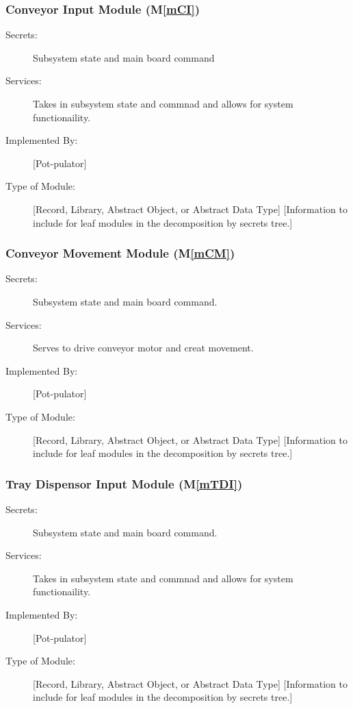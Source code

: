 \documentclass[12pt, titlepage]{article}
\newcommand{\mref}[1]{M\ref{#1}}
\begin{document}
\subsubsection{Conveyor Input Module (\mref{mCI})}
\begin{description}
\item[Secrets:] Subsystem state and main board command
\item[Services:] Takes in subsystem state and commnad and allows for system functionaility.
\item[Implemented By:] [Pot-pulator]
\item[Type of Module:] [Record, Library, Abstract Object, or Abstract Data Type]
  [Information to include for leaf modules in the decomposition by secrets tree.]
\end{description}


\subsubsection{Conveyor Movement Module (\mref{mCM})}
\begin{description}
\item[Secrets:] Subsystem state and main board command.
\item[Services:] Serves to drive conveyor motor and creat movement.
\item[Implemented By:] [Pot-pulator]
\item[Type of Module:] [Record, Library, Abstract Object, or Abstract Data Type]
  [Information to include for leaf modules in the decomposition by secrets tree.]
\end{description}

\subsubsection{Tray Dispensor Input Module (\mref{mTDI})}
\begin{description}
\item[Secrets:] Subsystem state and main board command.
\item[Services:] Takes in subsystem state and commnad and allows for system functionaility.
\item[Implemented By:] [Pot-pulator]
\item[Type of Module:] [Record, Library, Abstract Object, or Abstract Data Type]
  [Information to include for leaf modules in the decomposition by secrets tree.]
\end{description}
\end{document}

